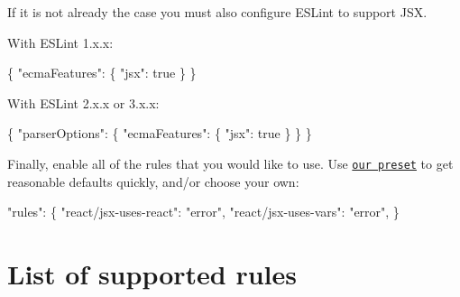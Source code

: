 If it is not already the case you must also configure {\ttfamily E\+S\+Lint} to support J\+SX.

With E\+S\+Lint 1.\+x.\+x\+:


\begin{DoxyCode}
\{
  "ecmaFeatures": \{
    "jsx": true
  \}
\}
\end{DoxyCode}


With E\+S\+Lint 2.\+x.\+x or 3.\+x.\+x\+:


\begin{DoxyCode}
\{
  "parserOptions": \{
    "ecmaFeatures": \{
      "jsx": true
    \}
  \}
\}
\end{DoxyCode}


Finally, enable all of the rules that you would like to use. Use \href{#recommended}{\tt our preset} to get reasonable defaults quickly, and/or choose your own\+:


\begin{DoxyCode}
"rules": \{
  "react/jsx-uses-react": "error",
  "react/jsx-uses-vars": "error",
\}
\end{DoxyCode}


\section*{List of supported rules}



